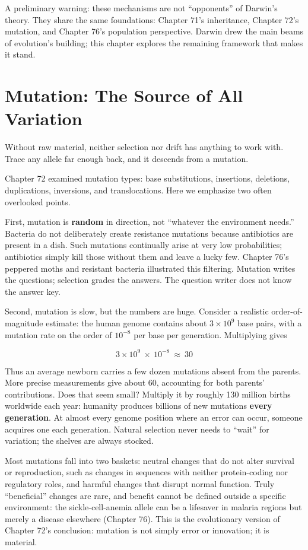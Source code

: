 A preliminary warning: these mechanisms are not ``opponents'' of Darwin's theory. They share the same foundations: Chapter 71's inheritance, Chapter 72's mutation, and Chapter 76's population perspective. Darwin drew the main beams of evolution's building; this chapter explores the remaining framework that makes it stand.

\section{Mutation: The Source of All Variation}

Without raw material, neither selection nor drift has anything to work with. Trace any allele far enough back, and it descends from a mutation.

Chapter 72 examined mutation types: base substitutions, insertions, deletions, duplications, inversions, and translocations. Here we emphasize two often overlooked points.

First, mutation is \textbf{random} in direction, not ``whatever the environment needs.'' Bacteria do not deliberately create resistance mutations because antibiotics are present in a dish. Such mutations continually arise at very low probabilities; antibiotics simply kill those without them and leave a lucky few. Chapter 76's peppered moths and resistant bacteria illustrated this filtering. Mutation writes the questions; selection grades the answers. The question writer does not know the answer key.

Second, mutation is slow, but the numbers are huge. Consider a realistic order-of-magnitude estimate: the human genome contains about $3\times 10^{9}$ base pairs, with a mutation rate on the order of $10^{-8}$ per base per generation. Multiplying gives

\[
3\times 10^{9}\ \times\ 10^{-8}\ \approx\ 30
\]

Thus an average newborn carries a few dozen mutations absent from the parents. More precise measurements give about 60, accounting for both parents' contributions. Does that seem small? Multiply it by roughly 130 million births worldwide each year: humanity produces billions of new mutations \textbf{every generation}. At almost every genome position where an error can occur, someone acquires one each generation. Natural selection never needs to ``wait'' for variation; the shelves are always stocked.

Most mutations fall into two baskets: neutral changes that do not alter survival or reproduction, such as changes in sequences with neither protein-coding nor regulatory roles, and harmful changes that disrupt normal function. Truly ``beneficial'' changes are rare, and benefit cannot be defined outside a specific environment: the sickle-cell-anemia allele can be a lifesaver in malaria regions but merely a disease elsewhere (Chapter 76). This is the evolutionary version of Chapter 72's conclusion: mutation is not simply error or innovation; it is material.

